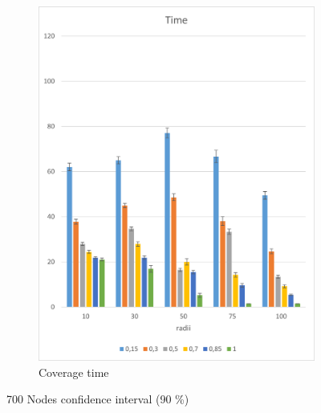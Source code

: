 \begin{figure}[H]
\begin{subfigure}{.5\textwidth}
  \includegraphics[width=1\linewidth]{./images/700endtimeCI.png}
  \caption{Coverage time}
  \label{fig:sub2}
\end{subfigure}
\caption{700 Nodes confidence interval (90 \%)}
\label{fig:test}
\end{figure}